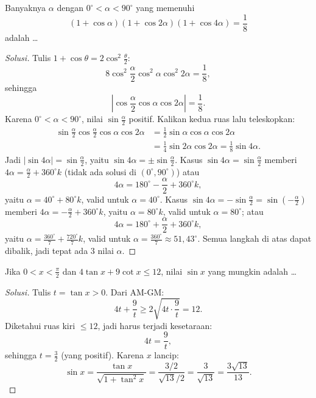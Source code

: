 \documentclass[12pt]{scrartcl}
\begin{document}
\begin{example}[OSK 2013]
Banyaknya $\alpha$ dengan $0^{\circ} < \alpha < 90^{\circ}$ yang memenuhi
\[ (1+\cos\alpha)(1+\cos 2\alpha)(1+\cos 4\alpha) = \frac18 \]
adalah \dots
\end{example}
\begin{proof}[Solusi]
Tulis $1 + \cos\theta = 2\cos^2\frac{\theta}{2}$:
\[ 8\cos^2\frac{\alpha}{2}\cos^2\alpha\cos^2 2\alpha = \frac18, \]
sehingga
\[ \left|\cos\frac{\alpha}{2}\cos\alpha\cos 2\alpha\right| = \frac18. \]
Karena $0^{\circ} < \alpha < 90^{\circ}$, nilai $\sin\frac{\alpha}{2}$ positif.
Kalikan kedua ruas lalu teleskopkan:
\begin{align*}
\sin\frac{\alpha}{2}\cos\frac{\alpha}{2}\cos\alpha\cos 2\alpha
&= \tfrac12\sin\alpha\cos\alpha\cos 2\alpha \\
&= \tfrac14\sin 2\alpha\cos 2\alpha = \tfrac18\sin 4\alpha.
\end{align*}
Jadi $|\sin 4\alpha| = \sin\frac{\alpha}{2}$, yaitu $\sin 4\alpha = \pm\sin\frac{\alpha}{2}$.
Kasus $\sin 4\alpha = \sin\frac{\alpha}{2}$ memberi $4\alpha = \frac{\alpha}{2} + 360^{\circ}k$
(tidak ada solusi di $(0^{\circ}, 90^{\circ})$) atau
\[ 4\alpha = 180^{\circ} - \frac{\alpha}{2} + 360^{\circ}k, \]
yaitu $\alpha = 40^{\circ} + 80^{\circ}k$, valid untuk $\alpha = 40^{\circ}$.
Kasus $\sin 4\alpha = -\sin\frac{\alpha}{2} = \sin\left(-\frac{\alpha}{2}\right)$
memberi $4\alpha = -\frac{\alpha}{2} + 360^{\circ}k$, yaitu $\alpha = 80^{\circ}k$,
valid untuk $\alpha = 80^{\circ}$; atau
\[ 4\alpha = 180^{\circ} + \frac{\alpha}{2} + 360^{\circ}k, \]
yaitu $\alpha = \frac{360^{\circ}}{7} + \frac{720^{\circ}}{7}k$,
valid untuk $\alpha = \frac{360^{\circ}}{7} \approx 51{,}43^{\circ}$.
Semua langkah di atas dapat dibalik, jadi tepat ada $3$ nilai $\alpha$.
\end{proof}

\begin{example}[OSP 2016]
Jika $0 < x < \frac{\pi}{2}$ dan $4\tan x + 9\cot x \le 12$,
nilai $\sin x$ yang mungkin adalah \dots
\end{example}
\begin{proof}[Solusi]
Tulis $t = \tan x > 0$. Dari AM-GM:
\[ 4t + \frac{9}{t} \ge 2\sqrt{4t \cdot \frac{9}{t}} = 12. \]
Diketahui ruas kiri $\le 12$, jadi harus terjadi kesetaraan:
\[ 4t = \frac{9}{t}, \]
sehingga $t = \frac32$ (yang positif). Karena $x$ lancip:
\[ \sin x = \frac{\tan x}{\sqrt{1+\tan^2 x}}
= \frac{3/2}{\sqrt{13}/2} = \frac{3}{\sqrt{13}} = \frac{3\sqrt{13}}{13}. \]
\end{proof}
\end{document}
